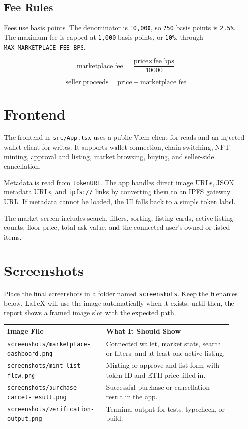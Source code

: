 \documentclass[11pt,a4paper]{article}
\newcommand{\code}[1]{\texttt{#1}}
\begin{document}
\subsection{Fee Rules}

Fees use basis points. The denominator is \code{10,000}, so \code{250} basis points is \code{2.5\%}. The maximum fee is capped at \code{1,000} basis points, or \code{10\%}, through \code{MAX\_MARKETPLACE\_FEE\_BPS}.

\[
    \text{marketplace fee} = \frac{\text{price} \times \text{fee bps}}{10000}
\]

\[
    \text{seller proceeds} = \text{price} - \text{marketplace fee}
\]

\section{Frontend}

The frontend in \code{src/App.tsx} uses a public Viem client for reads and an injected wallet client for writes. It supports wallet connection, chain switching, NFT minting, approval and listing, market browsing, buying, and seller-side cancellation.

Metadata is read from \code{tokenURI}. The app handles direct image URLs, JSON metadata URLs, and \code{ipfs://} links by converting them to an IPFS gateway URL. If metadata cannot be loaded, the UI falls back to a simple token label.

The market screen includes search, filters, sorting, listing cards, active listing counts, floor price, total ask value, and the connected user's owned or listed items.

\clearpage
\section{Screenshots}

Place the final screenshots in a folder named \code{screenshots}. Keep the filenames below. LaTeX will use the image automatically when it exists; until then, the report shows a framed image slot with the expected path.

\begin{longtable}{p{0.39\linewidth} p{0.53\linewidth}}
\toprule
\textbf{Image File} & \textbf{What It Should Show} \\
\midrule
\endhead
\code{screenshots/marketplace-dashboard.png} & Connected wallet, market stats, search or filters, and at least one active listing. \\
\code{screenshots/mint-list-flow.png} & Minting or approve-and-list form with token ID and ETH price filled in. \\
\code{screenshots/purchase-cancel-result.png} & Successful purchase or cancellation result in the app. \\
\code{screenshots/verification-output.png} & Terminal output for tests, typecheck, or build. \\
\bottomrule
\end{longtable}
\end{document}
